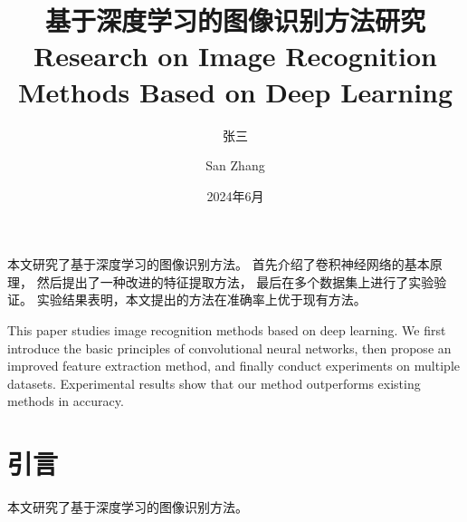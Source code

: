 \documentclass[type=master, professional]{sduthesis}
\title{基于深度学习的图像识别方法研究}
\title*{Research on Image Recognition Methods Based on Deep Learning}
\author{张三}
\author*{San Zhang}
\date{2024年6月}
\begin{document}
\makecover

\begin{cnabstract}
  本文研究了基于深度学习的图像识别方法。
  首先介绍了卷积神经网络的基本原理，
  然后提出了一种改进的特征提取方法，
  最后在多个数据集上进行了实验验证。
  实验结果表明，本文提出的方法在准确率上优于现有方法。
\end{cnabstract}

\begin{enabstract}
  This paper studies image recognition methods based on deep learning.
  We first introduce the basic principles of convolutional neural networks,
  then propose an improved feature extraction method,
  and finally conduct experiments on multiple datasets.
  Experimental results show that our method outperforms existing methods in accuracy.
\end{enabstract}


\tableofcontents

\chapter{引言}
本文研究了基于深度学习的图像识别方法。

\printbibliography

\makedeclaration
\end{document}
